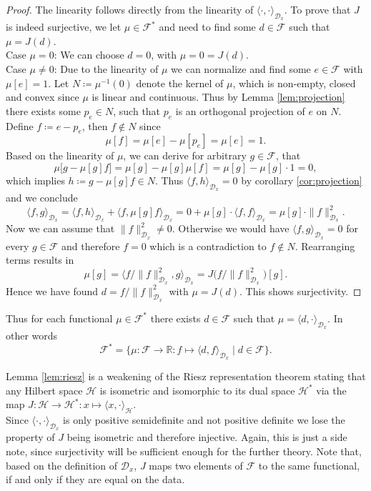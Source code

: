 \documentclass[11pt, a4paper]{article}
\newcommand{\R}{\mathds{R}}
\newcommand{\D}{\mathcal{D}}
\newcommand{\F}{\mathcal{F}}
\renewcommand{\H}{\mathcal{H}}
\begin{document}
\begin{proof}
The linearity follows directly from the linearity of $\langle \cdot, \cdot \rangle_{\D_x}$. To prove that $J$ is indeed surjective, we let $\mu \in \F^*$ and need to find some $d \in \F$ such that $\mu = J(d)$. \\

Case $\mu=0$: We can choose $d=0$, with $\mu = 0 = J(d)$. \\

Case $\mu \neq 0$: Due to the linearity of $\mu$ we can normalize and find some $e \in \F$ with $\mu[e] = 1$. Let $N \coloneq \mu^{-1}(0)$ denote the kernel of $\mu$, which is non-empty, closed and convex since $\mu$ is linear and continuous. Thus by Lemma \ref{lem:projection} there exists some $p_e \in N$, such that $p_e$ is an orthogonal projection of $e$ on $N$. Define $f \coloneq e - p_e$, then $f \notin N$ since
\[ \mu[f] = \mu[e] - \mu[p_e] = \mu[e] = 1. \]
Based on the linearity of $\mu$, we can derive for arbitrary $g \in \F$, that
\[ \mu \big [g- \mu[g]f \big] = \mu[g] - \mu[g] \mu[f] = \mu[g] - \mu[g] \cdot 1 = 0 , \]
which implies $h \coloneq g - \mu[g]f \in N$. Thus $\langle f , h \rangle_{\D_x} = 0$ by corollary \ref{cor:projection} and we conclude
\[ \langle f, g \rangle_{\D_x} = \langle f , h \rangle_{\D_x} + \langle f , \mu[g]f \rangle_{\D_x} = 0 + \mu[g] \cdot \langle f , f \rangle_{\D_x} = \mu[g] \cdot \| f \|_{\D_x}^2. \]
Now we can assume that $\| f \|_{\D_x}^2 \neq 0$. Otherwise we would have $\langle f, g \rangle_{\D_x} = 0$ for every $g \in \F$ and therefore $f = 0$ which is a contradiction to $f \notin N$. Rearranging terms results in
\[ \mu[g] = \big \langle f / \| f \|_{\D_x}^2 , g \big \rangle_{\D_x} = J \big (f / \| f \|_{\D_x}^2 \big)[g]. \]
Hence we have found $d = f / \| f \|_{\D_x}^2$ with $\mu = J(d)$. This shows surjectivity.
\end{proof}

Thus for each functional $\mu \in \F^*$ there exists $d \in \F$ such that $\mu = \langle d, \cdot \rangle_{\D_x}$. In other words
\[ \F^* = \Big \{ \mu : \F \to \R : f \mapsto \langle d,f \rangle _{\D_x} \mid d \in \F \Big \}. \]

Lemma \ref{lem:riesz} is a weakening of the Riesz representation theorem stating that any Hilbert space $\H$ is isometric and isomorphic to its dual space $\H^*$ via the map $J:\H \to \H^* : x \mapsto \langle x , \cdot \rangle_\H$. \\

Since $\langle \cdot , \cdot \rangle_{\D_x}$ is only positive semidefinite and not positive definite we lose the property of $J$ being isometric and therefore injective. Again, this is just a side note, since surjectivity will be sufficient enough for the further theory. Note that, based on the definition of $\D_x$, $J$ maps two elements of $\F$ to the same functional, if and only if they are equal on the data.  \\
\end{document}
